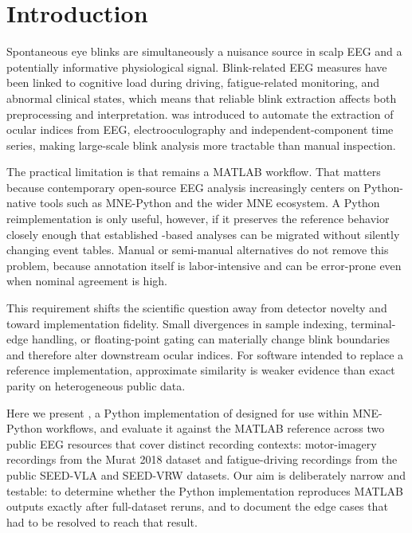 \section{Introduction}

Spontaneous eye blinks are simultaneously a nuisance source in scalp EEG and a potentially informative physiological signal. Blink-related EEG measures have been linked to cognitive load during driving, fatigue-related monitoring, and abnormal clinical states, which means that reliable blink extraction affects both preprocessing and interpretation.\supercite{alyan2023scirep,tarafder2022,wang2018,kimura2017,mentzel2017} \blinker{} was introduced to automate the extraction of ocular indices from EEG, electrooculography and independent-component time series, making large-scale blink analysis more tractable than manual inspection.\supercite{kleifges2017}

The practical limitation is that \blinker{} remains a MATLAB workflow. That matters because contemporary open-source EEG analysis increasingly centers on Python-native tools such as MNE-Python and the wider MNE ecosystem.\supercite{gramfort2013,appelhoff2019} A Python reimplementation is only useful, however, if it preserves the reference behavior closely enough that established \blinker-based analyses can be migrated without silently changing event tables. Manual or semi-manual alternatives do not remove this problem, because annotation itself is labor-intensive and can be error-prone even when nominal agreement is high.\supercite{jansen2020}

This requirement shifts the scientific question away from detector novelty and toward implementation fidelity. Small divergences in sample indexing, terminal-edge handling, or floating-point gating can materially change blink boundaries and therefore alter downstream ocular indices. For software intended to replace a reference implementation, approximate similarity is weaker evidence than exact parity on heterogeneous public data.

Here we present \tool, a Python implementation of \blinker{} designed for use within MNE-Python workflows, and evaluate it against the MATLAB reference across two public EEG resources that cover distinct recording contexts: motor-imagery recordings from the Murat 2018 dataset\supercite{kaya2018} and fatigue-driving recordings from the public SEED-VLA and SEED-VRW datasets.\supercite{luo2024} Our aim is deliberately narrow and testable: to determine whether the Python implementation reproduces MATLAB \blinker{} outputs exactly after full-dataset reruns, and to document the edge cases that had to be resolved to reach that result.
